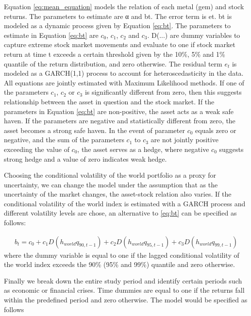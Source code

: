\documentclass[preprint,authoryear,11pt]{elsarticle}
\begin{document}
Equation \eqref{eq:mean_equation} models the relation of each metal (gem) and stock returns. The parameters to estimate are α and bt. The error term is et. bt is modeled as a dynamic process given by Equation \eqref{eq:bt}. The parameters to estimate in Equation \eqref{eq:bt} are $c_{0}$, $c_{1}$, $c_{2}$ and $c_{3}$. D(...) are dummy variables to capture extreme stock market movements and evaluate to one if stock market return at time t exceeds a certain threshold given by the 10\%, 5\% and 1\% quantile of the return distribution, and zero otherwise. The residual term $e_{t}$ is modeled as a GARCH(1,1) process to account for heteroscedasticity in the data. All equations are jointly estimated with Maximum Likelihood methods. If one of the parameters $c_{1}$, $c_{2}$ or $c_{3}$ is significantly different from zero, then this suggests relationship between the asset in question and the stock market. If the parameters in Equation \eqref{eq:bt} are non-positive, the asset acts as a weak safe haven. If the parameters are negative and statistically different from zero, the asset becomes a strong safe haven. In the event of parameter $c_{0}$ equals zero or negative, and the sum of the parameters $c_{1}$ to $c_{3}$ are not jointly positive exceeding the value of $c_{0}$, the asset serves as a hedge, where negative $c_{0}$ suggests strong hedge and a value of zero indicates weak hedge. \newline

Choosing the conditional volatility of the world portfolio as a proxy for uncertainty, we can change the model under the assumption that as the uncertainty of the market changes, the asset-stock relation also varies. If the conditional volatility of the world index is estimated with a GARCH process and different volatility levels are chose, an alternative to \eqref{eq:bt} can be specified as follows:

\begin{align}
	b_{t} = c_{0} + c_{1}D(h_{world}q_{90,t-1}) + c_{2}D(h_{world}q_{95,t-1}) + c_{3}D(h_{world}q_{99,t-1}) \label{eq:vol}
\end{align}
where the dummy variable is equal to one if the lagged conditional volatility of the world index exceeds the 90\% (95\% and 99\%) quantile and zero otherwise.

Finally we break down the entire study period and identify certain periods such as economic or financial crises. Time dummies are equal to one if the returns fall within the predefined period and zero otherwise. The model would be specified as follows
\end{document}
